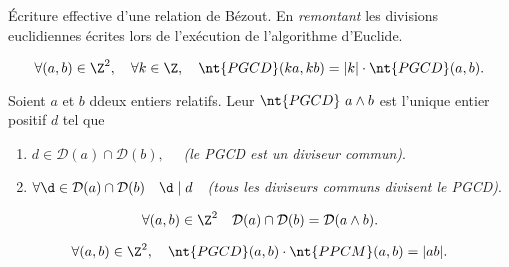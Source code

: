 \documentclass[11pt]{article}
\newcommand*{\PPCM}{\nt{PPCM}}
\newcommand*{\PGCD}{\nt{PGCD}}
\renewcommand*{\D}{\mathcal{D}}
\begin{document}
\begin{meth}{Écriture effective d'une relation de Bézout.}{}
    En \emph{remontant} les divisions euclidiennes écrites lors de l'exécution de l'algorithme d'Euclide.
\end{meth}

\begin{prop}{}{}
    \begin{equation*}
        \forall(a,b)\in\Z^2,\quad\forall k\in\Z,\quad\PGCD(ka,kb)=|k|\cdot\PGCD(a,b).
    \end{equation*}
\end{prop}

\begin{thm}{}{}
    Soient $a$ et $b$ ddeux entiers relatifs. Leur $\PGCD~a\land b$ est l'unique entier positif $d$ tel que
    \begin{enumerate}[topsep=0pt,itemsep=-0.9 ex]
        \item $d\in\D(a)\cap\D(b),\quad$ \emph{(le PGCD est un diviseur commun)}.
        \item $\forall \d\in\D(a)\cap\D(b)\quad\d\mid d\quad$\emph{(tous les diviseurs communs divisent le PGCD)}.
    \end{enumerate}
\end{thm}

\begin{corr}{}{}
    \begin{equation*}
        \forall(a,b)\in\Z^2\quad\D(a)\cap\D(b)=\D(a\land b).
    \end{equation*}
\end{corr}

\begin{prop}{}{}
    \begin{equation*}
        \forall(a,b)\in\Z^2,\quad\PGCD(a,b)\cdot\PPCM(a,b)=|ab|.
    \end{equation*}
\end{prop}
\end{document}
